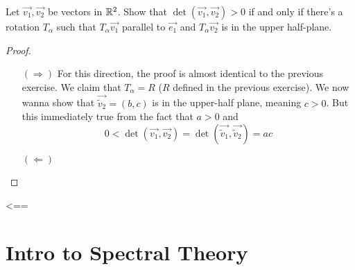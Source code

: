 \documentclass{article}
\begin{document}
\begin{exercise}
  Let $\vec{v_1},\vec{v_2}$ be vectors in $\R^2$. Show that 
  $\det(\vec{v_1},\vec{v_2})>0$ if and only if there's a rotation
  $T_{\alpha}$ such that $T_{\alpha}\vec{v_1}$ parallel to $\vec{e_1}$
  and $T_{\alpha}\vec{v_2}$ is in the upper half-plane.
\end{exercise}
\begin{proof}
  \text{}
  \begin{itemize}
    \item[$(\Rightarrow)$] For this direction, the proof is almost 
      identical to the previous exercise. We claim that 
      $T_{\alpha}=R$ ($R$ defined in the previous exercise).
      We now wanna show that $\vec{\tilde{v}_2}=(b,c)$ is in the 
      upper-half plane, meaning $c>0$. But this immediately true 
      from the fact that $a>0$ and
      \[
        0<\det(\vec{v_1},\vec{v_2})=
        \det(\vec{\tilde{v}_1},\vec{\tilde{v}_2})=ac
      \]
    \item[$(\Leftarrow)$]
  \end{itemize}
\end{proof}
<==
\chapter{Intro to Spectral Theory}
\end{document}

